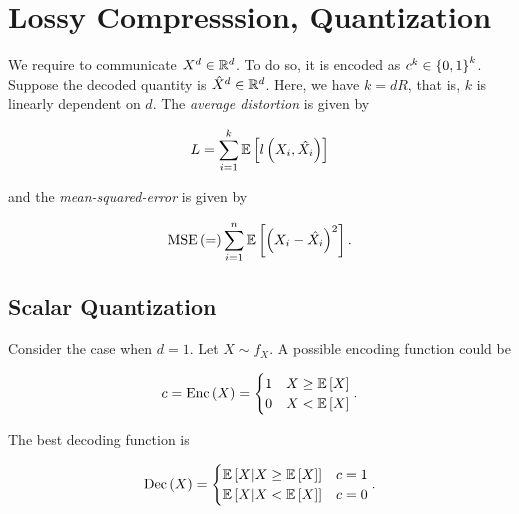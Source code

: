 \documentclass[twoside]{article}
\begin{document}



\section{Lossy Compresssion, Quantization}

We require to communicate \(X^d\in\mathbb R^d\). To do so, it is encoded as \(c^k\in\left\{0,1\right\}^k\). Suppose the decoded quantity is \(\hat{X}^d\in\mathbb R^d\). Here, we have \(k = dR\), that is, \(k\) is linearly dependent on \(d\). The \emph{average distortion} is given by

\begin{equation}
    L = \sum_{i=1}^k\mathbb{E}\left[ l\left(X_i,\hat{X_i}\right) \right]
    \label{eq:avg-dist}
\end{equation}

and the \emph{mean-squared-error} is given by

\begin{equation}
    \mathrm{MSE}\left(=\right) \sum_{i=1}^n\mathbb{E}\left[ \left(X_i-\hat{X_i}\right)^2 \right].
    \label{eq:mse-def}
\end{equation}

\subsection{Scalar Quantization}

Consider the case when \(d=1\). Let \(X\sim f_X\). A possible encoding function could be

\begin{equation}
    c = \mathrm{Enc}\left(X\right) =
    \begin{cases}
        1 & X \ge \mathbb{E}\left[ X \right] \\
        0 & X < \mathbb{E}\left[ X \right]
    \end{cases}.
    \label{eq:enc-possible}
\end{equation}

The best decoding function is

\begin{equation}
    \mathrm{Dec}\left(X\right) =
    \begin{cases}
        \mathbb{E}\left[ X|X\ge\mathbb{E}\left[ X \right] \right] & c = 1 \\
        \mathbb{E}\left[ X|X<\mathbb{E}\left[ X \right] \right] & c = 0
    \end{cases}.
    \label{eq:dec-possible}
\end{equation}
\end{document}
